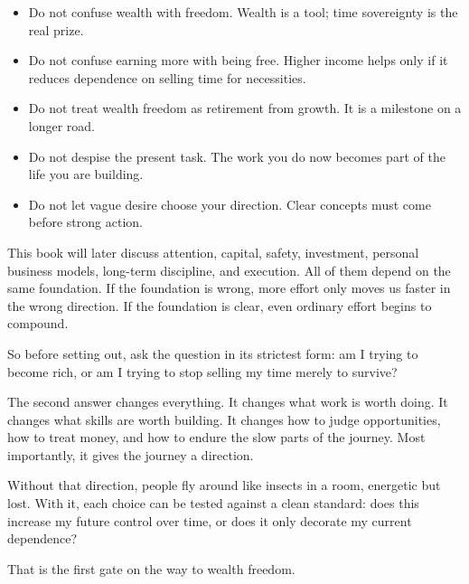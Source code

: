\begin{itemize}
\item Do not confuse wealth with freedom. Wealth is a tool; time sovereignty is the real prize.
\item Do not confuse earning more with being free. Higher income helps only if it reduces dependence on selling time for necessities.
\item Do not treat wealth freedom as retirement from growth. It is a milestone on a longer road.
\item Do not despise the present task. The work you do now becomes part of the life you are building.
\item Do not let vague desire choose your direction. Clear concepts must come before strong action.
\end{itemize}

This book will later discuss attention, capital, safety, investment, personal business models, long-term discipline, and execution. All of them depend on the same foundation. If the foundation is wrong, more effort only moves us faster in the wrong direction. If the foundation is clear, even ordinary effort begins to compound.

So before setting out, ask the question in its strictest form: am I trying to become rich, or am I trying to stop selling my time merely to survive?

The second answer changes everything. It changes what work is worth doing. It changes what skills are worth building. It changes how to judge opportunities, how to treat money, and how to endure the slow parts of the journey. Most importantly, it gives the journey a direction.

Without that direction, people fly around like insects in a room, energetic but lost. With it, each choice can be tested against a clean standard: does this increase my future control over time, or does it only decorate my current dependence?

That is the first gate on the way to wealth freedom.
